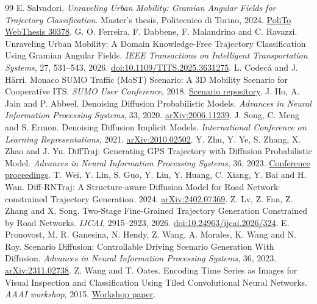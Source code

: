 \begin{thebibliography}{99}
 E. Salvadori, \emph{Unraveling Urban Mobility: Gramian Angular Fields for Trajectory Classification}. Master's thesis, Politecnico di Torino, 2024. \href{https://webthesis.biblio.polito.it/30378/}{PoliTo WebThesis 30378}.
 G. O. Ferreira, F. Dabbene, F. Malandrino and C. Ravazzi. Unraveling Urban Mobility: A Domain Knowledge-Free Trajectory Classification Using Gramian Angular Fields. \emph{IEEE Transactions on Intelligent Transportation Systems}, 27, 531--543, 2026. \href{https://doi.org/10.1109/TITS.2025.3631275}{doi:10.1109/TITS.2025.3631275}.
 L. Codec\'a and J. H\"arri. Monaco SUMO Traffic (MoST) Scenario: A 3D Mobility Scenario for Cooperative ITS. \emph{SUMO User Conference}, 2018. \href{https://github.com/lcodeca/MoSTScenario}{Scenario repository}.
 J. Ho, A. Jain and P. Abbeel. Denoising Diffusion Probabilistic Models. \emph{Advances in Neural Information Processing Systems}, 33, 2020. \href{https://arxiv.org/abs/2006.11239}{arXiv:2006.11239}.
 J. Song, C. Meng and S. Ermon. Denoising Diffusion Implicit Models. \emph{International Conference on Learning Representations}, 2021. \href{https://arxiv.org/abs/2010.02502}{arXiv:2010.02502}.
 Y. Zhu, Y. Ye, S. Zhang, X. Zhao and J. Yu. DiffTraj: Generating GPS Trajectory with Diffusion Probabilistic Model. \emph{Advances in Neural Information Processing Systems}, 36, 2023. \href{https://proceedings.neurips.cc/paper_files/paper/2023/hash/cd9b4a28fb9eebe0430c3312a4898a41-Abstract.html}{Conference proceedings}.
 T. Wei, Y. Lin, S. Guo, Y. Lin, Y. Huang, C. Xiang, Y. Bai and H. Wan. Diff-RNTraj: A Structure-aware Diffusion Model for Road Network-constrained Trajectory Generation. 2024. \href{https://arxiv.org/abs/2402.07369}{arXiv:2402.07369}.
 Z. Lv, Z. Fan, Z. Zhang and X. Song. Two-Stage Fine-Grained Trajectory Generation Constrained by Road Networks. \emph{IJCAI}, 2915--2923, 2026. \href{https://doi.org/10.24963/ijcai.2026/324}{doi:10.24963/ijcai.2026/324}.
 E. Pronovost, M. R. Ganesina, N. Hendy, Z. Wang, A. Morales, K. Wang and N. Roy. Scenario Diffusion: Controllable Driving Scenario Generation With Diffusion. \emph{Advances in Neural Information Processing Systems}, 36, 2023. \href{https://arxiv.org/abs/2311.02738}{arXiv:2311.02738}.
 Z. Wang and T. Oates. Encoding Time Series as Images for Visual Inspection and Classification Using Tiled Convolutional Neural Networks. \emph{AAAI workshop}, 2015. \href{https://cdn.aaai.org/ocs/ws/ws0115/10179-46015-1-PB.pdf}{Workshop paper}.

\end{thebibliography}

